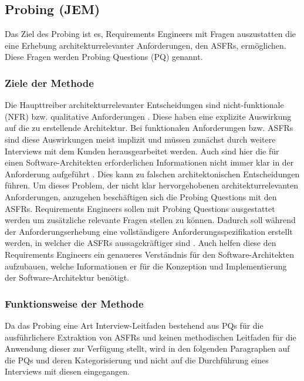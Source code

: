 \subsection{Probing (JEM)}\label{probing}

Das Ziel des Probing ist es, Requirements Engineers mit Fragen auszustatten die eine Erhebung architekturrelevanter Anforderungen, den ASFRs, erm\"oglichen. Diese Fragen werden Probing Questions (PQ) genannt. \\

\subsubsection{Ziele der Methode}

Die Haupttreiber architekturrelevanter Entscheidungen sind nicht-funktionale (NFR) bzw. qualitative Anforderungen \cite{Ros03}. Diese haben eine explizite Auswirkung auf die zu erstellende Architektur. Bei funktionalen Anforderungen bzw. ASFRs sind diese Auswirkungen meist implizit und m\"ussen zun\"achst durch weitere Interviews mit dem Kunden herausgearbeitet werden. Auch sind hier die f\"ur einen Software-Architekten erforderlichen Informationen nicht immer klar in der Anforderung aufgef\"uhrt \cite{Ros03}. Dies kann zu falschen architektonischen Entscheidungen f\"uhren. Um dieses Problem, der nicht klar hervorgehobenen architekturrelevanten Anforderungen, anzugehen besch\"aftigen sich die Probing Questions mit den ASFRs. Requirements Engineers sollen mit Probing Questions ausgestattet werden um zus\"atzliche relevante Fragen stellen zu k\"onnen. Dadurch soll w\"ahrend der Anforderungserhebung eine vollst\"andigere Anforderungsspezifikation erstellt werden, in welcher die ASFRs aussagekr\"aftiger sind \cite{Ros03}. Auch helfen diese den Requirements Engineers ein genaueres Verst\"andnis f\"ur den Software-Architekten aufzubauen, welche Informationen er f\"ur die Konzeption und Implementierung der Software-Architektur ben\"otigt. \\

\subsubsection{Funktionsweise der Methode}

Da das Probing eine Art Interview-Leitfaden bestehend aus PQs f\"ur die ausf\"uhrlichere Extraktion von ASFRs und keinen methodischen Leitfaden f\"ur die Anwendung dieser zur Verf\"ugung stellt, wird in den folgenden Paragraphen auf die PQs und deren Kategorisierung und nicht auf die Durchf\"uhrung eines Interviews mit diesen eingegangen. \\


